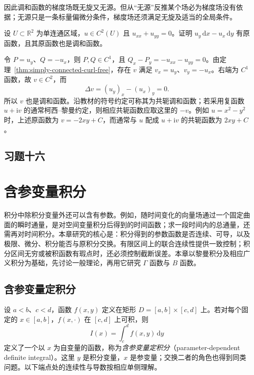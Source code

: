 \documentclass[UTF8,12pt,a4paper,fontset=fandol]{ctexbook}
\begin{document}
因此调和函数的梯度场既无旋又无源。但从“无源”反推某个场必为梯度场没有依据；无源只是一条标量偏微分条件，梯度场还须满足无旋及适当的全局条件。

\begin{example}
\label{ex:harmonic-conjugate-potential}
设 $U\subset\mathbb R^2$ 为单连通区域，$u\in C^2(U)$ 且 $u_{xx}+u_{yy}=0$。证明 $u_y\,\mathrm dx-u_x\,\mathrm dy$ 有原函数，且其原函数也是调和函数。
\end{example}
\begin{solve}
令 $P=u_y$、$Q=-u_x$，则 $P,Q\in C^1$，且 $Q_x-P_y=-u_{xx}-u_{yy}=0$。由定理~\ref{thm:simply-connected-curl-free}，存在 $v$ 满足 $v_x=u_y$、$v_y=-u_x$。右端为 $C^1$ 函数，故 $v\in C^2$，而
\[
    \Delta v=(u_y)_x-(u_x)_y=0.
\]
所以 $v$ 也是调和函数。沿教材的符号约定可称其为共轭调和函数；若采用复函数 $u+\mathrm iv$ 的通常柯西--黎曼约定，则相应共轭函数应取这里的 $-v$。例如 $u=x^2-y^2$ 时，上述原函数为 $v=-2xy+C$，而通常与 $u$ 配成 $u+\mathrm iv$ 的共轭函数为 $2xy+C$。
\end{solve}



\section*{习题十六}

\chapter{含参变量积分}
\label{chap:parameter-dependent-integrals}

积分中除积分变量外还可以含有参数。例如，随时间变化的向量场通过一个固定曲面的瞬时通量，是对空间变量积分后得到的时间函数；求一段时间内的总通量，还需再对时间积分。本章研究的核心是：积分得到的参数函数是否连续、可导，以及极限、微分、积分能否与原积分交换。有限区间上的联合连续性提供一致控制；积分区间无穷或被积函数有瑕点时，还必须控制截断误差。本章以黎曼积分及相应广义积分为基础，先讨论一般理论，再用它研究 $\Gamma$ 函数与 $B$ 函数。

\section{含参变量定积分}
\label{sec:parameter-dependent-definite-integrals}

设 $a<b$、$c<d$，函数 $f(x,y)$ 定义在矩形 $D=[a,b]\times[c,d]$ 上。若对每个固定的 $x\in[a,b]$，$f(x,\cdot)$ 在 $[c,d]$ 上可积，则
\[
    I(x)=\int_c^d f(x,y)\,\mathrm{d}y
\]
定义了一个以 $x$ 为自变量的函数，称为\emph{含参变量定积分}（parameter-dependent definite integral）。这里 $y$ 是积分变量，$x$ 是参变量；交换二者的角色也得到同类问题。以下端点处的连续性与导数按相应单侧理解。
\end{document}
